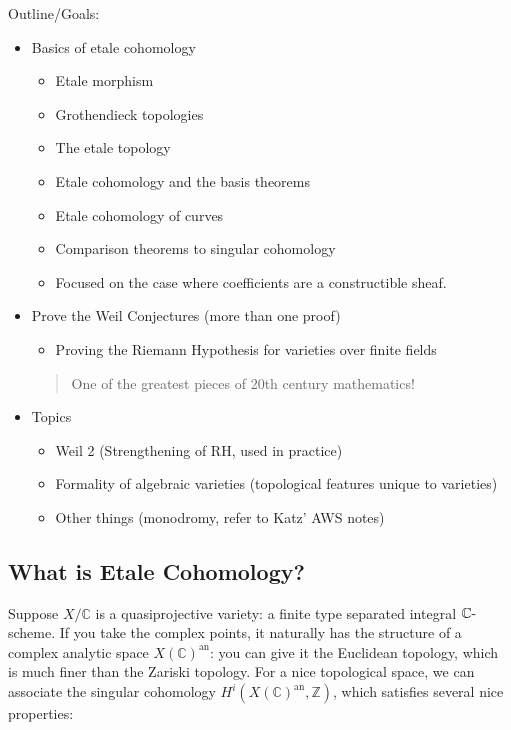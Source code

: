 Outline/Goals:

\begin{itemize}
\tightlist
\item
  Basics of etale cohomology

  \begin{itemize}
  \tightlist
  \item
    Etale morphism
  \item
    Grothendieck topologies
  \item
    The etale topology
  \item
    Etale cohomology and the basis theorems
  \item
    Etale cohomology of curves
  \item
    Comparison theorems to singular cohomology
  \item
    Focused on the case where coefficients are a constructible sheaf.
  \end{itemize}
\item
  Prove the Weil Conjectures (more than one proof)

  \begin{itemize}
  \tightlist
  \item
    Proving the Riemann Hypothesis for varieties over finite fields
  \end{itemize}

  \begin{quote}
  One of the greatest pieces of 20th century mathematics!
  \end{quote}
\item
  Topics

  \begin{itemize}
  \tightlist
  \item
    Weil 2 (Strengthening of RH, used in practice)
  \item
    Formality of algebraic varieties (topological features unique to
    varieties)
  \item
    Other things (monodromy, refer to Katz' AWS notes)
  \end{itemize}
\end{itemize}

\hypertarget{what-is-etale-cohomology-1}{%
\subsection{What is Etale
Cohomology?}\label{what-is-etale-cohomology-1}}

Suppose \(X/{\mathbb{C}}\) is a quasiprojective variety: a finite type
separated integral \({\mathbb{C}}{\hbox{-}}\)scheme. If you take the
complex points, it naturally has the structure of a complex analytic
space \(X({\mathbb{C}})^{\text{an}}\): you can give it the Euclidean
topology, which is much finer than the Zariski topology. For a nice
topological space, we can associate the singular cohomology
\(H^i(X({\mathbb{C}})^{\text{an}}, {\mathbb{Z}})\), which satisfies
several nice properties:

